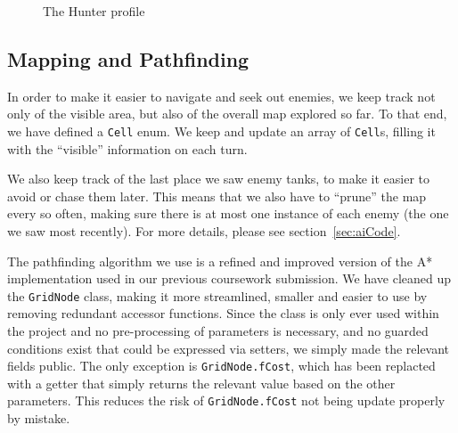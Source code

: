 \documentclass[11pt]{article}
\begin{document}
{\begin{landscape}
\begin{figure}[h]
  \caption{The Hunter profile}
  \label{fig:hunter}
\end{figure}
\vspace*{\fill}
\end{landscape}
}

\subsection{Mapping and Pathfinding}

In order to make it easier to navigate and seek out enemies, we keep track not only of the visible area, but also of the overall map explored so far.  To that end, we have defined a \verb|Cell| enum. We keep and update an array of \verb|Cell|s, filling it with the ``visible'' information on each turn. 

We also keep track of the last place we saw enemy tanks, to make it easier to avoid or chase them later. This means that we also have to ``prune'' the map every so often, making sure there is at most one instance of each enemy (the one we saw most recently). For more details, please see section~\ref{sec:aiCode}.

The pathfinding algorithm we use is a refined and improved version of the A* implementation used in our previous coursework submission\cite{theGloriousWe}. We have cleaned up the \verb|GridNode| class, making it more streamlined, smaller and easier to use by removing redundant accessor functions. Since the class is only ever used within the project and no pre-processing of parameters is necessary, and no guarded conditions exist that could be expressed via setters, we simply made the relevant fields public. The only exception is \verb|GridNode.fCost|, which has been replacted with a getter that simply returns the relevant value based on the other parameters. This reduces the risk of \verb|GridNode.fCost| not being update properly by mistake.
\end{document}
